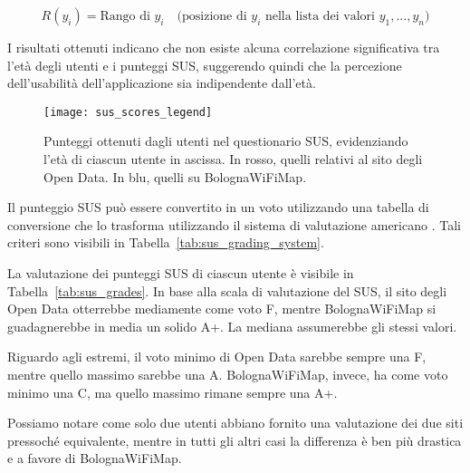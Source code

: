 \begin{equation}
    R(y_i) = \text{Rango di } y_i \quad \text{(posizione di } y_i \text{ nella lista dei valori } y_1, ..., y_n \text{)}
    \label{eq:rank_y}
\end{equation}

I risultati ottenuti indicano che non esiste alcuna correlazione significativa tra l'età degli utenti e i punteggi SUS, suggerendo quindi che la percezione dell'usabilità dell'applicazione sia indipendente dall'età.

\begin{figure}[H]
    \centering
    \texttt{[image: sus\_scores\_legend]}
    \caption[Punteggi ottenuti nel questionario SUS]{Punteggi ottenuti dagli utenti nel questionario SUS, evidenziando l'età di ciascun utente in ascissa. In rosso, quelli relativi al sito degli Open Data. In blu, quelli su BolognaWiFiMap.}
    \label{fig:sus_scores}
\end{figure}

Il punteggio SUS può essere convertito in un voto utilizzando una tabella di conversione che lo trasforma utilizzando il sistema di valutazione americano \cite{SUS}. Tali criteri sono visibili in Tabella~\ref{tab:sus_grading_system}.

La valutazione dei punteggi SUS di ciascun utente è visibile in Tabella~\ref{tab:sus_grades}. In base alla scala di valutazione del SUS, il sito degli Open Data otterrebbe mediamente come voto F, mentre BolognaWiFiMap si guadagnerebbe in media un solido A+. La mediana assumerebbe gli stessi valori.

Riguardo agli estremi, il voto minimo di Open Data sarebbe sempre una F, mentre quello massimo sarebbe una A. BolognaWiFiMap, invece, ha come voto minimo una C, ma quello massimo rimane sempre una A+.

Possiamo notare come solo due utenti abbiano fornito una valutazione dei due siti pressoché equivalente, mentre in tutti gli altri casi la differenza è ben più drastica e a favore di BolognaWiFiMap.

